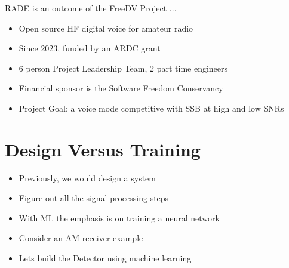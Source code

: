 \documentclass{beamer}
\begin{document}
\begin{frame}
RADE is an outcome of the FreeDV Project ...
\begin{itemize}
    \item Open source HF digital voice for amateur radio
    \item Since 2023, funded by an ARDC grant
    \item 6 person Project Leadership Team, 2 part time engineers
    \item Financial sponsor is the Software Freedom Conservancy
    \item Project Goal: a voice mode competitive with SSB at high and low SNRs
\end{itemize}
\end{frame}

\section{Design Versus Training}

\begin{frame}

\begin{itemize}
	\item Previously, we would design a system
	\item Figure out all the signal processing steps
	\item With ML the emphasis is on training a neural network
	\item Consider an AM receiver example
	\item Lets build the Detector using machine learning
\end{itemize}


\end{frame}
\end{document}
